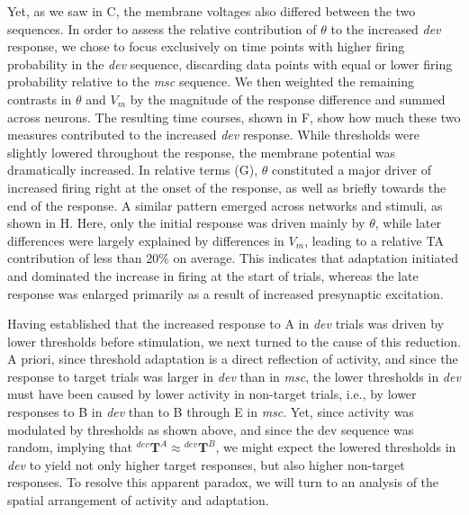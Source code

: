 \documentclass[9pt,lineno,onehalfspacing]{elife}
\newcommand{\dev}{\textit{dev}}
\newcommand{\msc}{\textit{msc}}
\newcommand{\T}[3][]{{}^{#1}_{}\boldsymbol T^{#2}_{#3}}
\begin{document}
Yet, as we saw in C, the membrane voltages also differed between the two sequences. In order to assess the relative contribution of $\theta$ to the increased \dev{} response, we chose to focus exclusively on time points with higher firing probability in the \dev{} sequence, discarding data points with equal or lower firing probability relative to the \msc{} sequence. We then weighted the remaining contrasts in $\theta$ and $V_m$ by the magnitude of the response difference and summed across neurons. The resulting time courses, shown in F, show how much these two measures contributed to the increased \dev{} response. While thresholds were slightly lowered throughout the response, the membrane potential was dramatically increased. In relative terms (G), $\theta$ constituted a major driver of increased firing right at the onset of the response, as well as briefly towards the end of the response. A similar pattern emerged across networks and stimuli, as shown in H. Here, only the initial response was driven mainly by $\theta$, while later differences were largely explained by differences in $V_m$, leading to a relative TA contribution of less than 20\% on average. This indicates that adaptation initiated and dominated the increase in firing at the start of trials, whereas the late response was enlarged primarily as a result of increased presynaptic excitation.

Having established that the increased response to A in \dev{} trials was driven by lower thresholds before stimulation, we next turned to the cause of this reduction. A priori, since threshold adaptation is a direct reflection of activity, and since the response to target trials was larger in \dev{} than in \msc{}, the lower thresholds in \dev{} must have been caused by lower activity in non-target trials, i.e., by lower responses to B in \dev{} than to B through E in \msc{}. Yet, since activity was modulated by thresholds as shown above, and since the dev sequence was random, implying that $\T[dev]{A}{} \approx \T[dev]{B}{}$, we might expect the lowered thresholds in \dev{} to yield not only higher target responses, but also higher non-target responses. To resolve this apparent paradox, we will turn to an analysis of the spatial arrangement of activity and adaptation.
\end{document}
